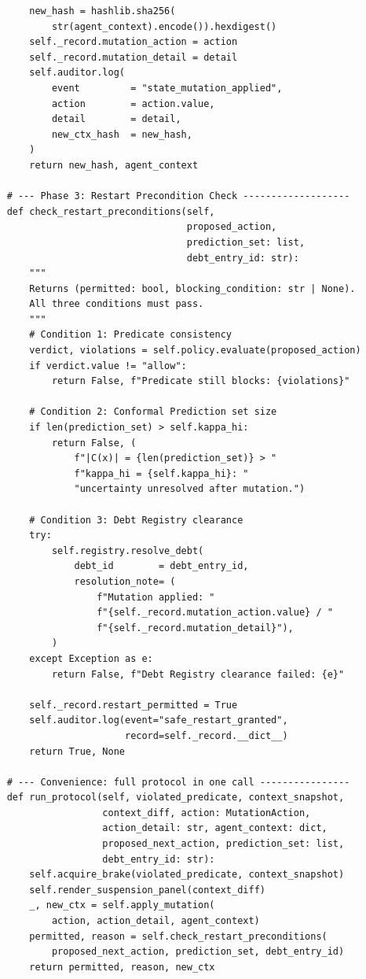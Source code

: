\begin{lstlisting}
        new_hash = hashlib.sha256(
            str(agent_context).encode()).hexdigest()
        self._record.mutation_action = action
        self._record.mutation_detail = detail
        self.auditor.log(
            event         = "state_mutation_applied",
            action        = action.value,
            detail        = detail,
            new_ctx_hash  = new_hash,
        )
        return new_hash, agent_context

    # --- Phase 3: Restart Precondition Check -------------------
    def check_restart_preconditions(self,
                                    proposed_action,
                                    prediction_set: list,
                                    debt_entry_id: str):
        """
        Returns (permitted: bool, blocking_condition: str | None).
        All three conditions must pass.
        """
        # Condition 1: Predicate consistency
        verdict, violations = self.policy.evaluate(proposed_action)
        if verdict.value != "allow":
            return False, f"Predicate still blocks: {violations}"

        # Condition 2: Conformal Prediction set size
        if len(prediction_set) > self.kappa_hi:
            return False, (
                f"|C(x)| = {len(prediction_set)} > "
                f"kappa_hi = {self.kappa_hi}: "
                "uncertainty unresolved after mutation.")

        # Condition 3: Debt Registry clearance
        try:
            self.registry.resolve_debt(
                debt_id        = debt_entry_id,
                resolution_note= (
                    f"Mutation applied: "
                    f"{self._record.mutation_action.value} / "
                    f"{self._record.mutation_detail}"),
            )
        except Exception as e:
            return False, f"Debt Registry clearance failed: {e}"

        self._record.restart_permitted = True
        self.auditor.log(event="safe_restart_granted",
                         record=self._record.__dict__)
        return True, None

    # --- Convenience: full protocol in one call ----------------
    def run_protocol(self, violated_predicate, context_snapshot,
                     context_diff, action: MutationAction,
                     action_detail: str, agent_context: dict,
                     proposed_next_action, prediction_set: list,
                     debt_entry_id: str):
        self.acquire_brake(violated_predicate, context_snapshot)
        self.render_suspension_panel(context_diff)
        _, new_ctx = self.apply_mutation(
            action, action_detail, agent_context)
        permitted, reason = self.check_restart_preconditions(
            proposed_next_action, prediction_set, debt_entry_id)
        return permitted, reason, new_ctx
\end{lstlisting}

